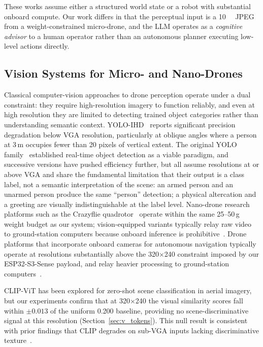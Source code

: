 \documentclass[journal]{IEEEtran}
\begin{document}
These works assume either a structured world state or a robot with
substantial onboard compute.
Our work differs in that the perceptual input is a \SI{10}{\kilo\byte}
JPEG from a weight-constrained micro-drone, and the LLM operates as a
\emph{cognitive advisor} to a human operator rather than an autonomous
planner executing low-level actions directly.

\subsection{Vision Systems for Micro- and Nano-Drones}

Classical computer-vision approaches to drone perception operate under a
dual constraint: they require high-resolution imagery to function reliably,
and even at high resolution they are limited to detecting trained object
categories rather than understanding semantic context.
YOLO-IHD~\cite{kim2024yoloihd} reports significant precision degradation
below VGA resolution, particularly at oblique angles where a person at
3\,m occupies fewer than 20 pixels of vertical extent.
The original YOLO family~\cite{redmon2016yolo} established real-time
object detection as a viable paradigm, and successive versions have pushed
efficiency further, but all assume resolutions at or above VGA and share
the fundamental limitation that their output is a class label, not a
semantic interpretation of the scene: an armed person and an unarmed
person produce the same ``person'' detection; a physical altercation and
a greeting are visually indistinguishable at the label level.
Nano-drone research platforms such as the Crazyflie
quadrotor~\cite{giernacki2017crazyflie} operate within the same 25--50\,g
weight budget as our system; vision-equipped variants typically relay raw
video to ground-station computers because onboard inference is
prohibitive~\cite{palossi2019nanotas}.
Drone platforms that incorporate onboard cameras for autonomous navigation
typically operate at resolutions substantially above the 320$\times$240
constraint imposed by our ESP32-S3-Sense payload, and relay heavier
processing to ground-station computers~\cite{palossi2019nanotas}.

CLIP-ViT has been explored for zero-shot scene classification in aerial
imagery, but our experiments confirm that at 320$\times$240 the visual
similarity scores fall within $\pm0.013$ of the uniform 0.200 baseline,
providing no scene-discriminative signal at this resolution
(Section~\ref{sec:v_tokens}).
This null result is consistent with prior findings that CLIP degrades on
sub-VGA inputs lacking discriminative texture~\cite{radford2021clip}.
\end{document}
